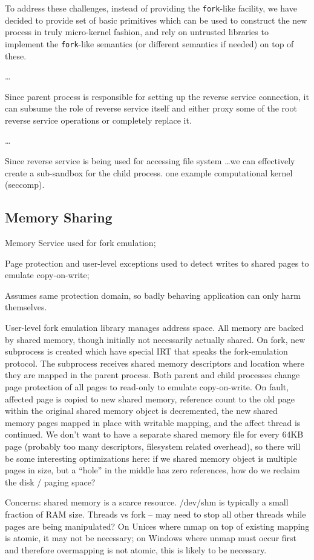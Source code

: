 To address these challenges, instead of providing the
\lstinline`fork`-like facility, we have decided to provide set of basic
primitives which can be used to construct the new process in truly
micro-kernel fashion, and rely on untrusted libraries to implement the
\lstinline`fork`-like semantics (\eg or different semantics if needed) on
top of these.

\ldots

Since parent process is responsible for setting up the reverse service
connection, it can subsume the role of reverse service itself and either
proxy some of the root reverse service operations or completely replace
it.

\ldots

Since reverse service is being used for accessing file system \ldots we
can effectively create a sub-sandbox for the child process. one example
computational kernel (seccomp).

\subsection{Memory Sharing}
\label{sub:memory_sharing}

\begin{structure}
\item Memory Service used for fork emulation;
\item Page protection and user-level exceptions used to detect
  writes to shared pages to emulate copy-on-write;
\item Assumes same protection domain, so badly behaving application
  can only harm themselves.
\end{structure}

User-level fork emulation library manages address space.  All memory
are backed by shared memory, though initially not necessarily actually
shared.  On fork, new subprocess is created which have special IRT
that speaks the fork-emulation protocol.  The subprocess receives
shared memory descriptors and location where they are mapped in the
parent process.  Both parent and child processes change page
protection of all pages to read-only to emulate copy-on-write.  On
fault, affected page is copied to new shared memory, reference count
to the old page within the original shared memory object is
decremented, the new shared memory pages mapped in place with writable
mapping, and the affect thread is continued.  We don't want to have a
separate shared memory file for every 64KB page (probably too many
descriptors, filesystem related overhead), so there will be some
interesting optimizations here: if we shared memory object is multiple
pages in size, but a ``hole'' in the middle has zero references, how
do we reclaim the disk / paging space?

Concerns: shared memory is a scarce resource.  /dev/shm is typically a
small fraction of RAM size.  Threads vs fork -- may need to stop all
other threads while pages are being manipulated?  On Unices where mmap
on top of existing mapping is atomic, it may not be necessary; on
Windows where unmap must occur first and therefore overmapping is not
atomic, this is likely to be necessary.
